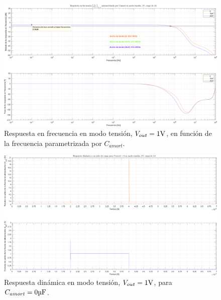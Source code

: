 \begin{figure}[H] %
\begin{center}
\includegraphics[width=1.1 \textwidth, angle=90]{./img/plots/rf/power_supply_CAMORT_RF_Modo2.png}
\caption{\label{fig:fig_power_supply_CAMORT_RF_Modo2}\footnotesize{Respuesta en frecuencia en modo tensión, $V_{out} = 1 \si[per-mode=symbol]{\volt}$, en función de la frecuencia parametrizada por $C_{amort}$.}}
\end{center}
\end{figure}

\clearpage

\begin{figure}[H] %
\begin{center}
\includegraphics[width=1.1 \textwidth, angle=90]{./img/plots/dynamic/power_supply_CAMORT_0_STEP_Modo2.png}
\caption{\label{fig:fig_power_supply_CAMORT_STEP_0_Modo2}\footnotesize{Respuesta dinámica en modo tensión, $V_{out} = 1 \si[per-mode=symbol]{\volt}$, para $C_{amort} = 0 \si[per-mode=symbol]{\micro\farad} $.}}
\end{center}
\end{figure}

